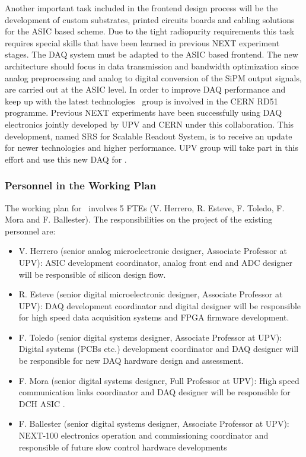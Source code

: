 Another important task included in the frontend design process will be the development of custom substrates, printed circuits boards and cabling solutions for the ASIC based scheme. Due to the tight radiopurity requirements this task requires special skills that have been learned in previous NEXT experiment stages.
The DAQ system must be adapted to the ASIC based frontend. The new architecture should focus in data transmission and bandwidth optimization since analog preprocessing and analog to digital conversion of the SiPM output signals, are carried out at the ASIC level. In order to improve DAQ performance and keep up with the latest technologies \sUPV\ group is involved in the CERN RD51 programme. Previous NEXT experiments have been successfully using DAQ electronics jointly developed by UPV and CERN under this collaboration. This development, named SRS for Scalable Readout System, is to receive an update for newer technologies and higher performance. UPV group will take part in this effort and use this new DAQ for \NHD.




\subsubsection*{Personnel in the Working Plan}
The working plan for \sUPV\ involves 5 FTEs (V. Herrero, R. Esteve, F. Toledo, F. Mora and F. Ballester). The responsibilities on the project of the existing personnel are:
\begin{itemize}[noitemsep,topsep=0pt,parsep=0pt,partopsep=0pt]
\item V. Herrero (senior analog microelectronic designer, Associate Professor at UPV): ASIC development coordinator, analog front end and ADC designer will be responsible of silicon design flow.
\item R. Esteve (senior digital microelectronic designer, Associate Professor at UPV): DAQ development coordinator and digital designer will be responsible for high speed data acquisition systems and FPGA firmware development.
\item F. Toledo (senior digital systems designer, Associate Professor at UPV): Digital systems (PCBs etc.) development coordinator and DAQ designer will be responsible for new DAQ hardware design and assessment.
\item F. Mora (senior digital systems designer, Full Professor at UPV): High speed communication links coordinator and DAQ designer will be responsible for DCH ASIC .
\item F. Ballester (senior digital systems designer, Associate Professor at UPV): NEXT-100 electronics operation and commissioning coordinator and responsible of future slow control hardware developments
\end{itemize}

